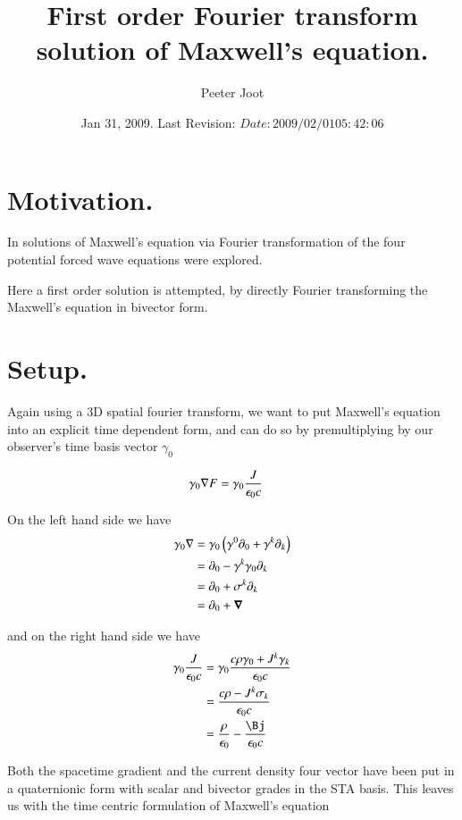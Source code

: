 \documentclass{article}
\title{ First order Fourier transform solution of Maxwell's equation. }
\author{Peeter Joot}
\date{ Jan 31, 2009.  Last Revision: $Date: 2009/02/01 05:42:06 $ }
\begin{document}
\maketitle{}

\tableofcontents

\section{ Motivation. }

In \cite{PJfourierMaxwellSecondOrder} solutions of Maxwell's equation
via Fourier transformation of the four potential forced wave equations were
explored.

Here a first order solution is attempted, by directly Fourier transforming
the Maxwell's equation in bivector form.

\section{ Setup. }

Again using a 3D spatial fourier transform, we want to put Maxwell's equation into an explicit time dependent form, and can do so by
premultiplying by our observer's time basis vector $\gamma_0$

\begin{align*}
\gamma_0 \nabla F &= \gamma_0 \frac{J }{\epsilon_0 c}
\end{align*}

On the left hand side we have
\begin{align*}
\gamma_0 \nabla 
&= \gamma_0 \left( \gamma^0 \partial_0 + \gamma^k \partial_k \right) \\
&= \partial_0 - \gamma^k \gamma_0 \partial_k \\
&= \partial_0 + \sigma^k \partial_k \\
&= \partial_0 + \boldsymbol{\nabla} \\
\end{align*}

and on the right hand side we have
\begin{align*}
\gamma_0 \frac{J }{\epsilon_0 c}
&= \gamma_0 \frac{c \rho \gamma_0 + J^k \gamma_k }{\epsilon_0 c} \\
&= \frac{c \rho - J^k \sigma_k }{\epsilon_0 c} \\
&= \frac{\rho}{\epsilon_0} - \frac{\Bj}{\epsilon_0 c} \\
\end{align*}

Both the spacetime gradient and the current density four vector have been put in a quaternionic form with scalar and bivector grades in the 
STA basis.  This leaves us with the time centric formulation of Maxwell's equation
\end{document}
